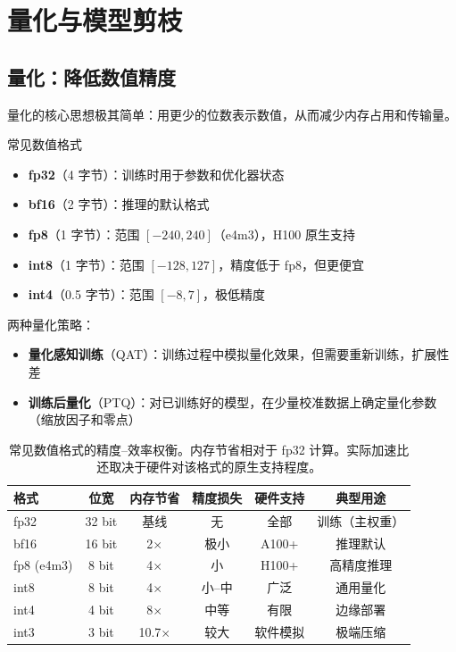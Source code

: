 \section{量化与模型剪枝}

\subsection{量化：降低数值精度}

量化的核心思想极其简单：用更少的位数表示数值，从而减少内存占用和传输量。

\begin{importantbox}{常见数值格式}
\begin{itemize}
    \item \textbf{fp32}（4 字节）：训练时用于参数和优化器状态
    \item \textbf{bf16}（2 字节）：推理的默认格式
    \item \textbf{fp8}（1 字节）：范围 $[-240, 240]$（e4m3），H100 原生支持
    \item \textbf{int8}（1 字节）：范围 $[-128, 127]$，精度低于 fp8，但更便宜
    \item \textbf{int4}（0.5 字节）：范围 $[-8, 7]$，极低精度
\end{itemize}
\end{importantbox}

两种量化策略：

\begin{itemize}
    \item \textbf{量化感知训练}（QAT）：训练过程中模拟量化效果，但需要重新训练，扩展性差
    \item \textbf{训练后量化}（PTQ）：对已训练好的模型，在少量校准数据上确定量化参数（缩放因子和零点）
\end{itemize}

\begin{table}[H]
\centering
\begin{tabular}{lccccc}
\toprule
\textbf{格式} & \textbf{位宽} & \textbf{内存节省} & \textbf{精度损失} & \textbf{硬件支持} & \textbf{典型用途} \\
\midrule
fp32 & 32 bit & 基线 & 无 & 全部 & 训练（主权重） \\
bf16 & 16 bit & 2$\times$ & 极小 & A100+ & 推理默认 \\
fp8 (e4m3) & 8 bit & 4$\times$ & 小 & H100+ & 高精度推理 \\
int8 & 8 bit & 4$\times$ & 小--中 & 广泛 & 通用量化 \\
int4 & 4 bit & 8$\times$ & 中等 & 有限 & 边缘部署 \\
int3 & 3 bit & 10.7$\times$ & 较大 & 软件模拟 & 极端压缩 \\
\bottomrule
\end{tabular}
\caption{常见数值格式的精度--效率权衡。内存节省相对于 fp32 计算。实际加速比还取决于硬件对该格式的原生支持程度。}
\end{table}

